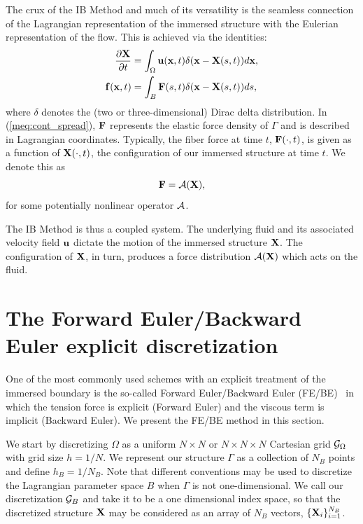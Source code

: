 The crux of the IB Method and much of its versatility is the seamless connection of the Lagrangian representation of the immersed structure with the Eulerian representation of the flow. This is achieved via the identities:
\begin{align}
\frac{\partial \mathbf{X}}{\partial t}  &= \int_{\Omega} \mathbf{u}(\mathbf{x},t)\delta(\mathbf{x}-\mathbf{X}(s,t)) d \mathbf{x}, \label{meq:cont_interp} \\
\mathbf{f}(\mathbf{x},t) &= \int_{B} \mathbf{F}(s,t)\delta(\mathbf{x}-\mathbf{X}(s,t)) ds
\label{meq:cont_spread},
\end{align}
where $\delta$ denotes the (two or three-dimensional) Dirac delta distribution. In (\ref{meq:cont_spread}), $\mathbf{F}$
represents the elastic force density of $\Gamma$ and is described in Lagrangian coordinates. Typically,   the fiber force at time $t$, $\mathbf{F}(\cdot,t)$, is given as a function of $\mathbf{X}(\cdot,t)$, the configuration of our immersed structure at time $t$. We denote this as
\begin{equation}
\mathbf{F} = \mathcal{A}(\mathbf{X}),
\end{equation}
for some potentially nonlinear operator $\mathcal{A}$.

The IB Method is thus a coupled system. The underlying fluid and its associated velocity field $\mathbf{u}$ dictate the motion of the immersed structure $\mathbf{X}$. The configuration of $\mathbf{X}$, in turn, produces a force distribution $\mathcal{A}(\mathbf{X})$ which acts on the fluid.


\section{The Forward Euler/Backward Euler explicit discretization}
\label{Sec:FEBE}
One of the most commonly used schemes with an explicit treatment of the immersed boundary is the 
so-called Forward Euler/Backward Euler (FE/BE)~\cite{SW99} in which the tension force is explicit (Forward Euler) and the 
viscous term is implicit (Backward Euler). We present the FE/BE method in this section.

We start by discretizing $\Omega$ as a uniform $N\times N$ or $N\times N\times N$ Cartesian grid $\mathcal{G}_\Omega$ with grid size $h=1/N$. We represent our structure $\Gamma$ as a collection of $N_B$ points and define $h_B=1/N_B$. Note that different conventions may be used to discretize the Lagrangian parameter space $B$ when $\Gamma$ is not one-dimensional. We call our discretization $\mathcal{G}_B$ and take it to be a one dimensional index space, so that the discretized structure $\mathbf{X}$ may be considered as an array of $N_B$ vectors, $\{\mathbf{X}_i\}_{i=1}^{N_B}$. 

